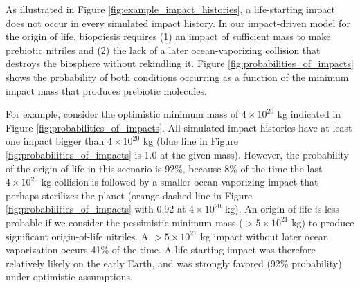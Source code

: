 \documentclass[manuscript]{aastex63}
\begin{document}
As illustrated in Figure \ref{fig:example_impact_histories}, a life-starting impact does not occur in every simulated impact history. In our impact-driven model for the origin of life, biopoiesis requires (1) an impact of sufficient mass to make prebiotic nitriles and (2) the lack of a later ocean-vaporizing collision that destroys the biosphere without rekindling it. Figure \ref{fig:probabilities_of_impacts} shows the probability of both conditions occurring as a function of the minimum impact mass that produces prebiotic molecules. 

For example, consider the \citet{Wogan_2023} optimistic minimum mass of $4 \times 10^{20}$ kg indicated in Figure \ref{fig:probabilities_of_impacts}. All simulated impact histories have at least one impact bigger than $4 \times 10^{20}$ kg (blue line in Figure \ref{fig:probabilities_of_impacts} is 1.0 at the given mass). However, the probability of the origin of life in this scenario is 92\%, because 8\% of the time the last $4 \times 10^{20}$ kg collision is followed by a smaller ocean-vaporizing impact that perhaps sterilizes the planet (orange dashed line in Figure \ref{fig:probabilities_of_impacts} with 0.92 at $4 \times 10^{20}$ kg). An origin of life is less probable if we consider the \citet{Wogan_2023} pessimistic minimum mass ($> 5 \times 10^{21}$ kg) to produce significant origin-of-life nitriles. A $> 5 \times 10^{21}$ kg impact without later ocean vaporization occurs 41\% of the time. A life-starting impact was therefore relatively likely on the early Earth, and was strongly favored (92\% probability) under optimistic assumptions.
\end{document}
